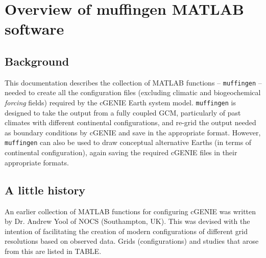 \documentclass[11pt,fleqn]{book} %
\begin{document}
\tableofcontents %

\cleardoublepage %

\pagestyle{fancy} %



\chapter{Overview of muffingen MATLAB software}

\section{Background}

This documentation describes the collection of MATLAB functions -- \texttt{muffingen} --  needed to create all the configuration files (excluding climatic and biogeochemical \textit{forcing} fields) required by the cGENIE Earth system model. \texttt{muffingen} is designed to take the output from a fully coupled GCM, particularly of past climates with different continental configurations, and re-grid the output needed as boundary conditions by cGENIE and save in the appropriate format. However, \texttt{muffingen} can also be used to draw conceptual alternative Earths (in terms of continental configuration), again saving the required cGENIE files in their appropriate formats.


\section{A little history}

An earlier collection of MATLAB functions for configuring cGENIE was written by Dr. Andrew Yool of NOCS (Southampton, UK). This was  devised with the intention of facilitating the creation of modern configurations of different grid resolutions based on observed data. Grids (configurations) and studies that arose from this are listed in TABLE.
\end{document}
